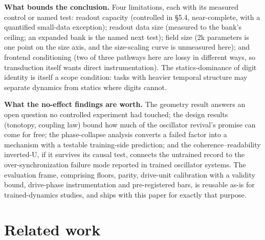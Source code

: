 \documentclass{article}
\makeatletter
\newcommand{\iclr@floatbarrier}{\par\vspace{\z@}%
  \ifx\@deferlist\@empty\else\clearpage\fi}
\let\iclr@section\section
\renewcommand{\section}{\iclr@floatbarrier\iclr@section}
\makeatother
\begin{document}
\textbf{What bounds the conclusion.} Four limitations, each with its
measured control or named test: readout capacity (controlled in §5.4,
near-complete, with a quantified small-data exception); readout data
size (measured to the bank's ceiling; an expanded bank is the named next
test); field size (2k parameters is one point on the size axis, and the
size-scaling curve is unmeasured here); and frontend conditioning (two
of three pathways here are lossy in different ways, so transduction
itself wants direct instrumentation). The statics-dominance of digit
identity is itself a scope condition: tasks with heavier temporal
structure may separate dynamics from statics where digits cannot.

\textbf{What the no-effect findings are worth.} The geometry result
answers an open question no controlled experiment had touched; the
design results (tonotopy, coupling law) bound how much of the oscillator
revival's promise can come for free; the phase-collapse analysis
converts a failed factor into a mechanism with a testable training-side
prediction; and the coherence--readability inverted-U, if it survives
its causal test, connects the untrained record to the
over-synchronization failure mode reported in trained oscillator
systems. The evaluation frame, comprising floors, parity, drive-unit
calibration with a validity bound, drive-phase instrumentation and
pre-registered bars, is reusable as-is for trained-dynamics studies, and
ships with this paper for exactly that purpose.

\section{Related work}\label{related-work}
\end{document}
